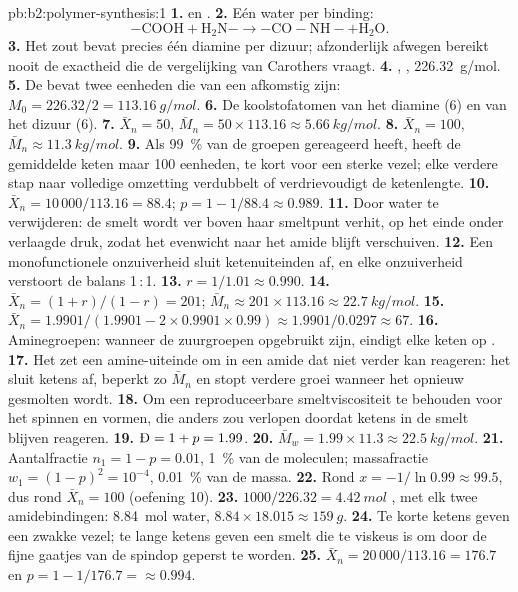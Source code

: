 \begin{solution}{pb:b2:polymer-synthesis:1}
\textbf{1.}  en .
\textbf{2.} Eén water per binding:
\[\mathrm{{-}COOH + H_2N{-} \longrightarrow {-}CO{-}NH{-} + H_2O}.\]
\textbf{3.} Het zout bevat precies één diamine per dizuur; afzonderlijk afwegen
bereikt nooit de exactheid die de vergelijking van Carothers vraagt.
\textbf{4.} \ce{-[NH(CH2)6NH-CO(CH2)4CO]-}, , \qty{226.32}{g/mol}.
\textbf{5.} De  bevat twee eenheden die van een  afkomstig zijn: $M_0 = 226.32/2 = \qty{113.16}{g/mol}$.
\textbf{6.} De koolstofatomen van het diamine (6) en van het dizuur (6).
\textbf{7.} $\bar X_n = 50$, $\bar M_n = 50 \times 113.16 \approx \qty{5.66}{kg/mol}$.
\textbf{8.} $\bar X_n = 100$, $\bar M_n \approx \qty{11.3}{kg/mol}$.
\textbf{9.} Als 99~\% van de groepen gereageerd heeft, heeft de gemiddelde keten maar 100 eenheden, te kort voor een
sterke vezel; elke verdere stap naar volledige omzetting verdubbelt of verdrievoudigt de ketenlengte.
\textbf{10.} $\bar X_n = 10\,000/113.16 = 88.4$; $p = 1 - 1/88.4 \approx 0.989$.
\textbf{11.} Door water te verwijderen: de smelt wordt ver boven haar smeltpunt verhit, op het einde onder verlaagde
druk, zodat het evenwicht naar het amide blijft verschuiven.
\textbf{12.} Een monofunctionele onzuiverheid sluit ketenuiteinden af, en elke onzuiverheid verstoort de balans 1\,:\,1.
\textbf{13.} $r = 1/1.01 \approx 0.990$.
\textbf{14.} $\bar X_n = (1+r)/(1-r) = 201$; $\bar M_n \approx 201 \times 113.16 \approx
\qty{22.7}{kg/mol}$.
\textbf{15.} $\bar X_n = 1.9901/(1.9901 - 2 \times 0.9901 \times 0.99) \approx 1.9901/0.0297 \approx
67$.
\textbf{16.} Aminegroepen: wanneer de zuurgroepen opgebruikt zijn, eindigt elke keten op .
\textbf{17.} Het zet een amine-uiteinde om in een amide dat niet verder kan reageren: het sluit ketens af, beperkt zo
$\bar M_n$ en stopt verdere groei wanneer het  opnieuw gesmolten wordt.
\textbf{18.} Om een reproduceerbare smeltviscositeit te behouden voor het spinnen en vormen, die anders
zou verlopen doordat ketens in de smelt blijven reageren.
\textbf{19.} $\text{\DH} = 1 + p = 1.99$.
\textbf{20.} $\bar M_w = 1.99 \times 11.3 \approx \qty{22.5}{kg/mol}$.
\textbf{21.} Aantalfractie $n_1 = 1 - p = 0.01$, 1~\% van de moleculen; massafractie $w_1 = (1-p)^2 =
10^{-4}$, 0.01~\% van de massa.
\textbf{22.} Rond $x = -1/\ln 0.99 \approx 99.5$, dus rond $\bar X_n = 100$ (oefening 10).
\textbf{23.} $1000/226.32 = \qty{4.42}{mol}$ , met elk twee amidebindingen: \qty{8.84}{mol}
water, $8.84 \times 18.015 \approx \qty{159}{g}$.
\textbf{24.} Te korte ketens geven een zwakke vezel; te lange ketens geven een smelt die te viskeus is om
door de fijne gaatjes van de spindop geperst te worden.
\textbf{25.} $\bar X_n = 20\,000/113.16 = 176.7$ en $p = 1 - 1/176.7 = \boldsymbol{\approx 0.994}$.
\end{solution}
